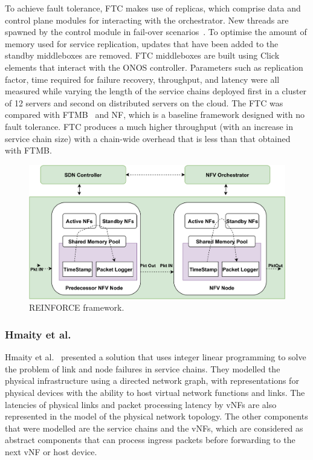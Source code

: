 \documentclass[futureinternet,review,accept,pdftex,moreauthors]{Definitions/mdpi}
\begin{document}
To achieve fault tolerance, FTC makes use of replicas, which comprise data and control plane modules for interacting with the orchestrator. New threads are spawned by the control module in fail-over scenarios~\cite{ghaznavi2020fault}. To optimise the amount of memory used for service replication, updates that have been added to the standby middleboxes are removed. FTC middleboxes are built using Click~\cite{kohler2000click} elements that interact with the ONOS controller. 
Parameters such as replication factor, time required for failure recovery, throughput, and latency were all measured while varying the length of the service chains deployed first in a cluster of 12 servers and second on distributed servers on the cloud. The FTC was compared with FTMB~\cite{sherry2015rollback} and NF, which is a baseline framework designed with no fault tolerance. FTC produces a much higher throughput (with an increase in service chain size) with a chain-wide overhead that is less than that obtained with FTMB.


\begin{figure}[H]%
\includegraphics[width=0.9\columnwidth]{REINFORCE.pdf}
\caption{REINFORCE framework.}
\label{REINFORCE}
\end{figure}



\subsubsection{{Hmaity et al.}}%
\label{SFC-failures}
Hmaity {et al.}~\cite{hmaity2016virtual} presented a solution that  uses integer linear programming to solve the problem of link and node failures in service chains. They modelled the physical infrastructure using a directed network graph, with representations for physical devices with the ability to host virtual network functions and links. The latencies of physical links and packet processing latency by vNFs are also represented in the model of the physical network topology. The other components that were modelled are the service chains and the vNFs, which are considered as abstract components that can process ingress packets before forwarding to the next vNF or host device.
\end{document}
